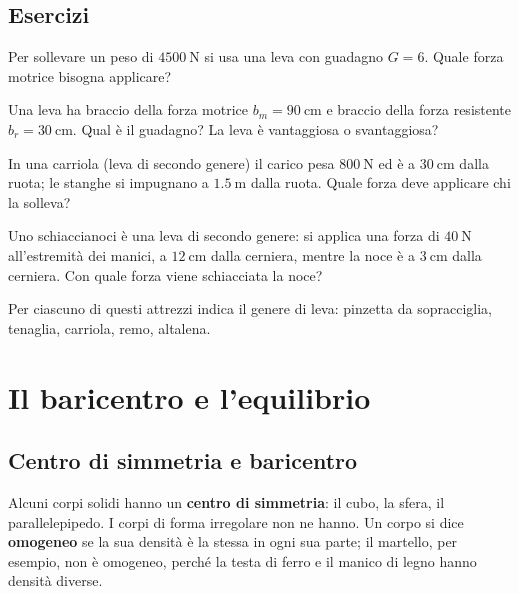 \subsection{Esercizi}

\begin{esercizio}
Per sollevare un peso di $\SI{4500}{\newton}$ si usa una leva con guadagno $G = 6$. Quale forza motrice bisogna applicare?\\
\end{esercizio}

\begin{esercizio}
Una leva ha braccio della forza motrice $b_m = \SI{90}{\centi\meter}$ e braccio della forza resistente $b_r = \SI{30}{\centi\meter}$. Qual è il guadagno? La leva è vantaggiosa o svantaggiosa?\\
\end{esercizio}

\begin{esercizio}
In una carriola (leva di secondo genere) il carico pesa $\SI{800}{\newton}$ ed è a $\SI{30}{\centi\meter}$ dalla ruota; le stanghe si impugnano a $\SI{1,5}{\meter}$ dalla ruota. Quale forza deve applicare chi la solleva?\\
\end{esercizio}

\begin{esercizio}
Uno schiaccianoci è una leva di secondo genere: si applica una forza di $\SI{40}{\newton}$ all'estremità dei manici, a $\SI{12}{\centi\meter}$ dalla cerniera, mentre la noce è a $\SI{3}{\centi\meter}$ dalla cerniera. Con quale forza viene schiacciata la noce?\\
\end{esercizio}

\begin{esercizio}
Per ciascuno di questi attrezzi indica il genere di leva: pinzetta da sopracciglia, tenaglia, carriola, remo, altalena.\\
\end{esercizio}


\section{Il baricentro e l'equilibrio}

\subsection{Centro di simmetria e baricentro}
Alcuni corpi solidi hanno un \textbf{centro di simmetria}: il cubo, la sfera, il parallelepipedo. I corpi di forma irregolare non ne hanno. Un corpo si dice \textbf{omogeneo} se la sua densità è la stessa in ogni sua parte; il martello, per esempio, non è omogeneo, perché la testa di ferro e il manico di legno hanno densità diverse.

